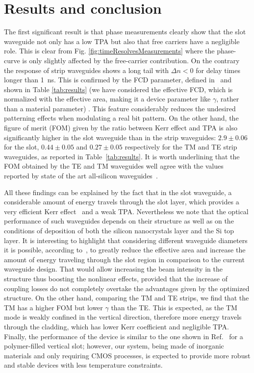 \documentclass[10pt,letterpaper]{article}
\begin{document}
\section{Results and conclusion}
The first significant result is that phase measurements clearly show that the slot waveguide not only has a low TPA but also that free carriers have a negligible role. This is clear from Fig. \ref{fig:timeResolvesMeasurements} where the phase-curve is only slightly affected by the free-carrier contribution. On the contrary the response of strip waveguides shows a long tail with $\Delta n <0$ for delay times longer than 1~ns. This is confirmed by the FCD parameter, defined in~\cite{Lin2007} and shown in Table \ref{tab:results} (we have considered the effective FCD, which is normalized with the effective area, making it a device parameter like $\gamma$, rather than a material parameter)
. This feature considerably reduces the undesired patterning effects when modulating a real bit pattern. On the other hand, the figure of merit (FOM) given by the ratio between Kerr effect and TPA is also significantly higher in the slot waveguide than in the strip waveguides: $2.9\pm 0.06$ for the slot, $0.44 \pm 0.05$ and $0.27 \pm 0.05$ respectively for the TM and TE strip waveguides, as reported in Table~\ref{tab:results}. It is worth underlining that the FOM obtained by the TE and TM waveguides well agree with the values reported by state of the art all-silicon waveguides~\cite{Koos2007a}.


All these findings can be explained by the fact that in the slot waveguide, a considerable amount of energy travels through the slot layer, which provides a very efficient Kerr effect~\cite{Trita2011} and a weak TPA. Nevertheless we note that the optical performance of such waveguides depends on their structure as well as on the conditions of deposition of both the silicon nanocrystals layer and the Si top layer. It is interesting to highlight that considering different waveguide diameters it is possible, according to~\cite{Rukhlenko2012}, to greatly reduce the effective area and increase the amount of energy traveling through the slot region in comparison to the current waveguide design. That would allow increasing the beam intensity in the structure thus boosting the nonlinear effects, provided that the increase of coupling losses do not completely overtake the advantages given by the optimized structure. On the other hand, comparing the TM and TE strips, we find that the TM has a higher FOM but lower $\gamma$ than the TE. This is expected, as the TM mode is weakly confined in the vertical direction, therefore more energy travels through the cladding, which has lower Kerr coefficient and negligible TPA. Finally,
the performance of the device is similar to the one shown in Ref.~\cite{Vallaitis2008} for a polymer-filled vertical slot; however, our system, being made of inorganic materials and only requiring CMOS processes, is expected to provide more robust and stable devices with less temperature constraints. 
\end{document}
